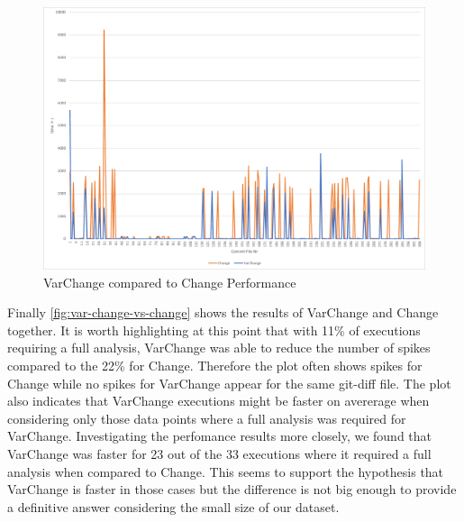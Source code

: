 \documentclass[a4paper]{article}
\begin{document}
\begin{figure}[h] 
  \centering
  \begin{minipage}[b]{1\textwidth} 
    \caption[VarChange compared to Change Performance]{VarChange compared to Change Performance}\label{fig:var-change-vs-change}
    \centering
    \includegraphics[height=1\textwidth, angle=90]{img/var-change-vs-change.pdf}
  \end{minipage}
\end{figure}


Finally \autoref{fig:var-change-vs-change} shows the results of VarChange and Change together. It is worth highlighting at this point that with 11\% of executions requiring a full analysis, VarChange was able to reduce the number of spikes compared to the 22\% for Change. Therefore the plot often shows spikes for Change while no spikes for VarChange appear for the same git-diff file.
The plot also indicates that VarChange executions might be faster on avererage when considering only those data points where a full analysis was required for VarChange. Investigating the perfomance results more closely, we found that VarChange was faster for 23 out of the 33 executions where it required a full analysis when compared to Change. This seems to support the hypothesis that VarChange is faster in those cases but the difference is not big enough to provide a definitive answer considering the small size of our dataset.
 
\end{document}
